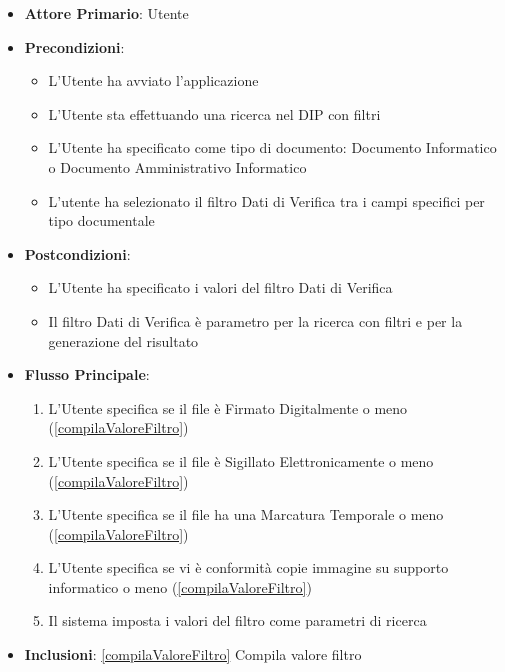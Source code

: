 \begin{itemize}
      \item \textbf{Attore Primario}: Utente
      \item \textbf{Precondizioni}: 
      \begin{itemize}
            \item L'Utente ha avviato l'applicazione
            \item L'Utente sta effettuando una ricerca nel DIP con filtri
            \item L'Utente ha specificato come tipo di documento: Documento Informatico o Documento Amministrativo Informatico
            \item L'utente ha selezionato il filtro Dati di Verifica tra i campi specifici per tipo documentale
      \end{itemize}
      \item \textbf{Postcondizioni}: \begin{itemize}
            \item L'Utente ha specificato i valori del filtro Dati di Verifica
            \item Il filtro Dati di Verifica è parametro per la ricerca con filtri e per la generazione del risultato
      \end{itemize}
      \item \textbf{Flusso Principale}:
      \begin{enumerate}
            \item L'Utente specifica se il file è Firmato Digitalmente o meno (\ref{compilaValoreFiltro})
            \item L'Utente specifica se il file è Sigillato Elettronicamente o meno (\ref{compilaValoreFiltro})
            \item L'Utente specifica se il file ha una Marcatura Temporale o meno (\ref{compilaValoreFiltro})
            \item L'Utente specifica se vi è conformità copie immagine su supporto informatico o
                  meno (\ref{compilaValoreFiltro})
            \item Il sistema imposta i valori del filtro come parametri di ricerca
      \end{enumerate}
      \item \textbf{Inclusioni}: \ref{compilaValoreFiltro} Compila valore filtro
\end{itemize}

